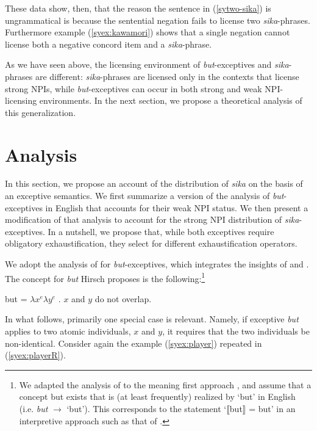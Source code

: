 \documentclass[output=paper]{langscibook}
\begin{document}
These data show, then, that the reason the sentence in (\ref{sytwo-sika}) is ungrammatical is because the sentential negation fails to license two \emph{sika}-phrases.  
Furthermore example (\ref{syex:kawamori}) shows that a single negation cannot license both a negative concord item and a \emph{sika}-phrase.

As we have seen above, the licensing environment of \emph{but}-exceptives and \emph{sika}-phrases are different: \emph{sika}-phrases are licensed only in the contexts that license strong NPIs, while \emph{but}-exceptives can occur in both strong and weak NPI-li\-cens\-ing environments.  In the next section, we propose a theoretical analysis of this generalization.

\section{Analysis}\label{sysc:analysis}

In this section, we propose an account of the distribution of \emph{sika} on the basis of an exceptive semantics.
We first summarize a version of the analysis of \emph{but}-exceptives in English that accounts for their weak NPI status.
We then present a modification of that analysis to account for the strong NPI distribution of \emph{sika}-exceptives. In a nutshell, we propose that, while both exceptives require obligatory exhaustification, they select for different exhaustification operators.


We adopt the analysis of \citet{hirsch16b} for \emph{but}-exceptives, which integrates the insights of \citet{fintel93} and \citet{gajewski08b}.
The concept for \emph{but} Hirsch proposes is the following:\footnote{We adapted the analysis of \citet{hirsch16b} to the meaning first approach \citep{sauerland20b}, and assume that a concept \textsf{but} exists that is (at least frequently) realized by `but' in English (i.e. \textit{but} $\longrightarrow$ `but').  This corresponds to the statement `⟦but⟧ = \textsf{but}' in an interpretive approach such as that of \citet{heim98}.} 

\ea \label{syex:but}
    \textsf{but} = $\lambda x^e  \lambda y^e$ . $x$ and $y$ do not overlap.\z

In what follows, primarily one special case is relevant. Namely, if exceptive \emph{but} applies to two atomic individuals, $x$ and $y$, it requires that the two individuals be non-identical.  
Consider again the example (\ref{syex:player}) repeated in (\ref{syex:playerR}).
\end{document}
